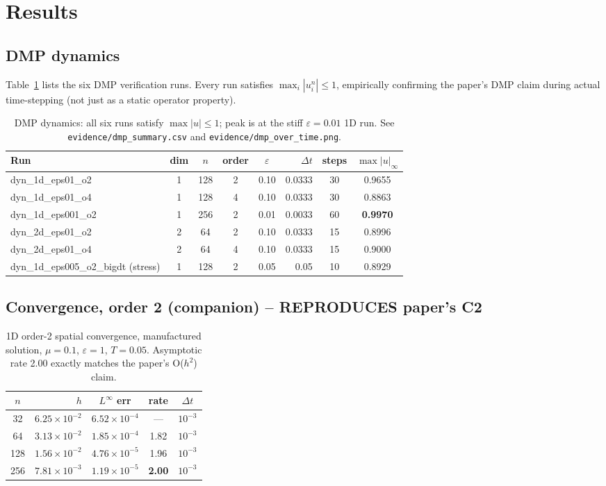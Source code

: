 \documentclass[11pt]{article}
\begin{document}
\section{Results}

\subsection{DMP dynamics}
Table~\ref{tab:dmp} lists the six DMP verification runs. Every run
satisfies $\max_i |u_i^n| \le 1$, empirically confirming the paper's
DMP claim during actual time-stepping (not just as a static operator
property).

\begin{table}[h]
\centering
\begin{tabular}{lccccrcc}
\toprule
Run & dim & $n$ & order & $\varepsilon$ & $\Delta t$ & steps & $\max|u|_\infty$ \\
\midrule
dyn\_1d\_eps01\_o2                    & 1 & 128 & 2 & 0.10 & 0.0333 & 30 & 0.9655 \\
dyn\_1d\_eps01\_o4                    & 1 & 128 & 4 & 0.10 & 0.0333 & 30 & 0.8863 \\
dyn\_1d\_eps001\_o2                   & 1 & 256 & 2 & 0.01 & 0.0033 & 60 & \textbf{0.9970} \\
dyn\_2d\_eps01\_o2                    & 2 & 64  & 2 & 0.10 & 0.0333 & 15 & 0.8996 \\
dyn\_2d\_eps01\_o4                    & 2 & 64  & 4 & 0.10 & 0.0333 & 15 & 0.9000 \\
dyn\_1d\_eps005\_o2\_bigdt (stress)   & 1 & 128 & 2 & 0.05 & 0.05   & 10 & 0.8929 \\
\bottomrule
\end{tabular}
\caption{DMP dynamics: all six runs satisfy $\max|u| \le 1$; peak is at
  the stiff $\varepsilon=0.01$ 1D run. See \texttt{evidence/dmp\_summary.csv}
  and \texttt{evidence/dmp\_over\_time.png}.}
\label{tab:dmp}
\end{table}

\subsection{Convergence, order 2 (companion) -- REPRODUCES paper's C2}

\begin{table}[h]
\centering
\begin{tabular}{crccc}
\toprule
$n$ & $h$ & $L^\infty$ err & rate & $\Delta t$ \\
\midrule
 32 & $6.25\!\times\!10^{-2}$ & $6.52\!\times\!10^{-4}$ & ---  & $10^{-3}$ \\
 64 & $3.13\!\times\!10^{-2}$ & $1.85\!\times\!10^{-4}$ & 1.82 & $10^{-3}$ \\
128 & $1.56\!\times\!10^{-2}$ & $4.76\!\times\!10^{-5}$ & 1.96 & $10^{-3}$ \\
256 & $7.81\!\times\!10^{-3}$ & $1.19\!\times\!10^{-5}$ & \textbf{2.00} & $10^{-3}$ \\
\bottomrule
\end{tabular}
\caption{1D order-2 spatial convergence, manufactured solution,
  $\mu=0.1$, $\varepsilon=1$, $T=0.05$. Asymptotic rate 2.00 exactly
  matches the paper's O($h^2$) claim.}
\end{table}
\end{document}
